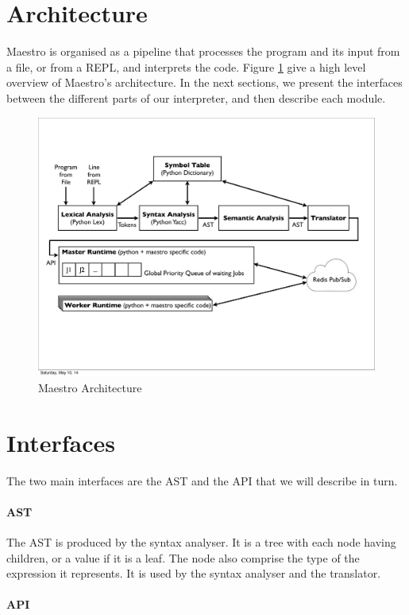 \section{Architecture}
Maestro is organised as a pipeline that processes the program and its input from a file, or from a REPL, and interprets the code. Figure \ref{fig:archi} give a high level overview of Maestro's architecture.
In the next sections, we present the interfaces between the different parts of our interpreter, and then describe each module.

\begin{figure}[h!]
  \centering
  \includegraphics[width=15cm]{figures/archi.pdf}
  \caption{Maestro Architecture}
\label{fig:archi}
\end{figure}

\section{Interfaces}
The two main interfaces are the AST and the API that we will describe in turn.

\paragraph{AST}

The AST is produced by the syntax analyser.
It is a tree with each node having children, or a value if it is a leaf.
The node also comprise the type of the expression it represents.
It is used by the syntax analyser and the translator.

\paragraph{API}

